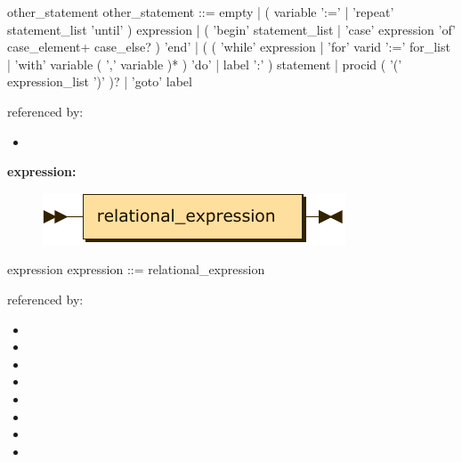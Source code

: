 \documentclass[10pt,a4paper,twoside]{article}
\providecommand{\tightlist}{%
  \setlength{\itemsep}{0pt}\setlength{\parskip}{0pt}}
\newcounter{grammarbox}[section]
\begin{document}
\begin{grammarbox}{other\_statement}
\vspace{0.5em}
other\_statement
         ::= empty
           | ( variable ':=' | 'repeat' statement\_list 'until' ) expression
           | ( 'begin' statement\_list | 'case' expression 'of' case\_element+ case\_else? ) 'end'
           | ( ( 'while' expression | 'for' varid ':=' for\_list | 'with' variable ( ',' variable )* ) 'do' | label ':' ) statement
           | procid ( '(' expression\_list ')' )?
           | 'goto' label
\end{grammarbox}

referenced by:

\begin{itemize}
\tightlist
\item
\end{itemize}

\textbf{expression:}

\begin{figure}[H]
\centering
\includegraphics{diagram/expression.pdf}

\end{figure}

\begin{grammarbox}{expression}
\vspace{0.5em}
expression
         ::= relational\_expression
\end{grammarbox}

referenced by:

\begin{itemize}
\tightlist
\item
\item
\item
\item
\item
\item
\item
\item
\end{itemize}
\end{document}
